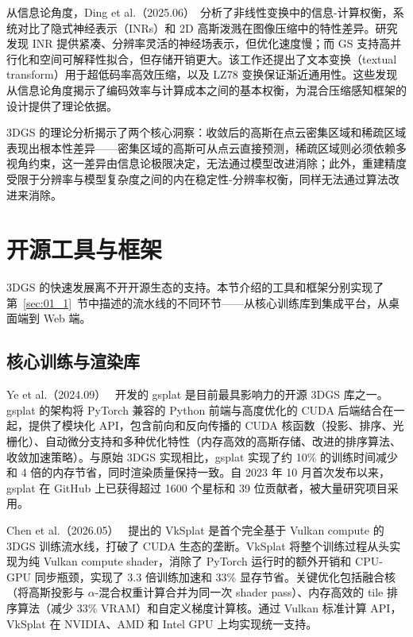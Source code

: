 从信息论角度，Ding et al.（2025.06）~\cite{2506_15948}分析了非线性变换中的信息-计算权衡，系统对比了隐式神经表示（INRs）和 2D 高斯泼溅在图像压缩中的特性差异。研究发现 INR 提供紧凑、分辨率灵活的神经场表示，但优化速度慢；而 GS 支持高并行化和空间可解释性拟合，但存储开销更大。该工作还提出了文本变换（textual transform）用于超低码率高效压缩，以及 LZ78 变换保证渐近通用性。这些发现从信息论角度揭示了编码效率与计算成本之间的基本权衡，为混合压缩感知框架的设计提供了理论依据。

\begin{takeaway}
3DGS 的理论分析揭示了两个核心洞察：收敛后的高斯在点云密集区域和稀疏区域表现出根本性差异——密集区域的高斯可从点云直接预测，稀疏区域则必须依赖多视角约束，这一差异由信息论极限决定，无法通过模型改进消除；此外，重建精度受限于分辨率与模型复杂度之间的内在稳定性-分辨率权衡，同样无法通过算法改进来消除。
\end{takeaway}



\section{开源工具与框架}
\label{sec:01_5}

3DGS 的快速发展离不开开源生态的支持。本节介绍的工具和框架分别实现了第~\ref{sec:01_1}~节中描述的流水线的不同环节——从核心训练库到集成平台，从桌面端到 Web 端。

\subsection{核心训练与渲染库}

Ye et al.（2024.09）~\cite{2409_06765} 开发的 gsplat 是目前最具影响力的开源 3DGS 库之一。gsplat 的架构将 PyTorch 兼容的 Python 前端与高度优化的 CUDA 后端结合在一起，提供了模块化 API，包含前向和反向传播的 CUDA 核函数（投影、排序、光栅化）、自动微分支持和多种优化特性（内存高效的高斯存储、改进的排序算法、收敛加速策略）。与原始 3DGS 实现相比，gsplat 实现了约 10\% 的训练时间减少和 4 倍的内存节省，同时渲染质量保持一致。自 2023 年 10 月首次发布以来，gsplat 在 GitHub 上已获得超过 1600 个星标和 39 位贡献者，被大量研究项目采用。

Chen et al.（2026.05）~\cite{2605_00219} 提出的 VkSplat 是首个完全基于 Vulkan compute 的 3DGS 训练流水线，打破了 CUDA 生态的垄断。VkSplat 将整个训练过程从头实现为纯 Vulkan compute shader，消除了 PyTorch 运行时的额外开销和 CPU-GPU 同步瓶颈，实现了 3.3 倍训练加速和 33\% 显存节省。关键优化包括融合核（将高斯投影与 $\alpha$-混合权重计算合并为同一次 shader pass）、内存高效的 tile 排序算法（减少 33\% VRAM）和自定义梯度计算核。通过 Vulkan 标准计算 API，VkSplat 在 NVIDIA、AMD 和 Intel GPU 上均实现统一支持。

